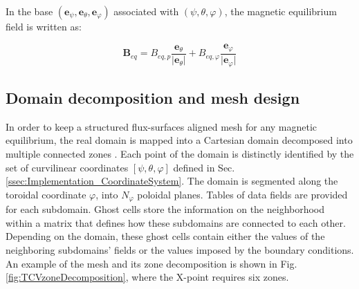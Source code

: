 In the base $(\boldsymbol{e}_{\psi}, \boldsymbol{e}_{\theta}, \boldsymbol{e}_{\varphi})$ associated with $(\psi, \theta, \varphi)$, the magnetic equilibrium field is written as:

\begin{equation}
	\boldsymbol{B}_{eq} = B_{eq,p} \frac{\boldsymbol{e}_{\theta}}{\vert \boldsymbol{e}_{\theta} \vert} + B_{eq,\varphi} \frac{\boldsymbol{e}_{\varphi}}{\vert \boldsymbol{e}_{\varphi} \vert}
\end{equation}



\subsection{Domain decomposition and mesh design}

In order to keep a structured flux-surfaces aligned mesh for any magnetic equilibrium, the real domain is mapped into a Cartesian domain decomposed into multiple connected zones \cite{tamain2016tokam3x}. Each point of the domain is distinctly identified by the set of curvilinear coordinates $[\psi, \theta, \varphi]$ defined in Sec. \ref{ssec:Implementation_CoordinateSystem}. The domain is segmented along the toroidal coordinate $\varphi$, into $N_{\varphi}$ poloidal planes. Tables of data fields are provided for each subdomain. Ghost cells store the information on the neighborhood within a matrix that defines how these subdomains are connected to each other. Depending on the domain, these ghost cells contain either the values of the neighboring subdomains' fields or the values imposed by the boundary conditions. An example of the mesh and its zone decomposition is shown in Fig. \ref{fig:TCVzoneDecomposition}, where the X-point requires six zones. \newline

